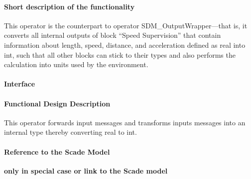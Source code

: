 \paragraph{Short description of the functionality}
This operator is the counterpart to operator SDM\_OutputWrapper---that is, it converts all internal outputs of block ``Speed Supervision'' that contain information about length, speed, distance, and acceleration defined as real into int, such that all other blocks can stick to their types and also performs the calculation into units used by the environment.

\paragraph{Interface}

\paragraph{Functional Design Description}
This operator forwards input messages and transforms inputs messages into an internal type thereby converting real to int.
  
\paragraph{Reference to the Scade Model}
\textbf{only in special case or link to the Scade model}